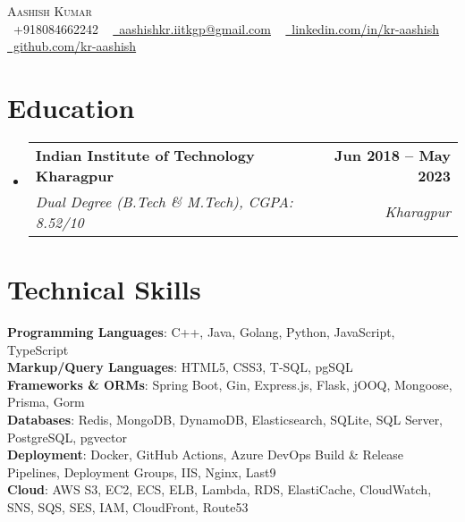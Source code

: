 \documentclass[letterpaper,11pt]{article}
\makeatletter
\newcommand{\resumeSubheading}[4]{
  \vspace{-2pt}\item
    \begin{tabular*}{1.0\textwidth}[t]{l@{\extracolsep{\fill}}r}
      \textbf{#1} & \textbf{\small #2} \\
      \textit{\small#3} & \textit{\small #4} \\
    \end{tabular*}\vspace{-7pt}
}
\newcommand{\resumeSubHeadingListStart}{\begin{itemize}[leftmargin=0.0in, label={}]}
\newcommand{\resumeSubHeadingListEnd}{\end{itemize}}
\makeatother
\begin{document}
\begin{center}
    {\Huge \scshape Aashish Kumar} \\ \vspace{2pt}
    \small \raisebox{-0.1\height}\faPhone\ +918084662242 ~ \href{mailto:aashishkr.iitkgp@gmail.com}{\raisebox{-0.2\height}\faEnvelope\  aashishkr.iitkgp@gmail.com} ~ 
    \href{https://www.linkedin.com/in/kr-aashish/}{\raisebox{-0.2\height}\faLinkedin\ linkedin.com/in/kr-aashish}  ~
    \href{https://github.com/kr-aashish}{\raisebox{-0.2\height}\faGithub\ github.com/kr-aashish}
    \vspace{-8pt}
\end{center}


\section{Education}
  \resumeSubHeadingListStart
    \resumeSubheading
      {Indian Institute of Technology Kharagpur}{Jun 2018 -- May 2023}
      {Dual Degree (B.Tech \& M.Tech), CGPA: 8.52/10}{Kharagpur}
  \resumeSubHeadingListEnd


\section{Technical Skills}
\begin{flushleft}
\setlength{\leftskip}{0.2in}
\small
\textbf{Programming Languages}{: C++, Java, Golang, Python, JavaScript, TypeScript} \\
\vspace{1pt}
\textbf{Markup/Query Languages}{: HTML5, CSS3, T‐SQL, pgSQL} \\
\vspace{1pt}
\textbf{Frameworks \& ORMs}{: Spring Boot, Gin, Express.js, Flask, jOOQ, Mongoose, Prisma, Gorm} \\
\vspace{1pt}
\textbf{Databases}{: Redis, MongoDB, DynamoDB, Elasticsearch, SQLite, SQL Server, PostgreSQL, pgvector} \\
\vspace{1pt}
\textbf{Deployment}{: Docker, GitHub Actions, Azure DevOps Build \& Release Pipelines, Deployment Groups, IIS, Nginx, Last9} \\
\vspace{1pt}
\textbf{Cloud}{: AWS S3, EC2, ECS, ELB, Lambda, RDS, ElastiCache, CloudWatch, SNS, SQS, SES, IAM, CloudFront, Route53 }
\end{flushleft}
 \vspace{-16pt}
\end{document}
